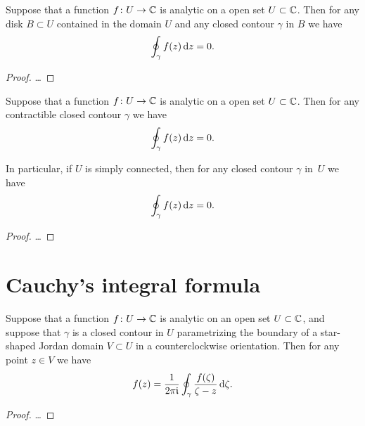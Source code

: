 \begin{corollary}
  \label{cor:local_cauchy_theorem}
  Suppose that a function $f \colon U \to \mathbb{C}$ is analytic on a open
  set $U \subset \mathbb{C}$.
  Then for any disk $B \subset U$ contained in the domain $U$
  and any closed contour $\gamma$ in $B$ we have
  \begin{align*}
    \oint_\gamma f(z) \, \mathrm{d} z = 0 .
  \end{align*}
\end{corollary}
\begin{proof}
  \ldots
\end{proof}

\begin{theorem}
  \label{thm:cauchy_theorem}
  Suppose that a function $f \colon U \to \mathbb{C}$ is analytic on a open
  set $U \subset \mathbb{C}$.
  Then for any contractible closed contour $\gamma$ we have
  \begin{align*}
    \oint_\gamma f(z) \, \mathrm{d} z = 0 .
  \end{align*}

  In particular, if $U$ is simply connected, then
  for any closed contour $\gamma$ in~$U$ we have
  \begin{align*}
    \oint_\gamma f(z) \, \mathrm{d} z = 0 .
  \end{align*}
\end{theorem}
\begin{proof}
  \ldots
\end{proof}



\section{Cauchy's integral formula}

\begin{theorem}
  \label{thm:cauchy_formula_star_shaped}
  Suppose that a function $f \colon U \to \mathbb{C}$ is analytic on an open
  set $U \subset \mathbb{C}$, and suppose that $\gamma$ is a closed contour
  in $U$ parametrizing the boundary of a star-shaped Jordan domain
  $V \subset U$ in a counterclockwise orientation.
  Then for any point $z \in V$ we have
  \begin{align*}
    f(z) = \frac{1}{2\pi \mathfrak{i}} \oint_\gamma \frac{f(\zeta)}{\zeta - z} \, \mathrm{d} \zeta .
  \end{align*}
\end{theorem}
\begin{proof}
  \ldots
\end{proof}

